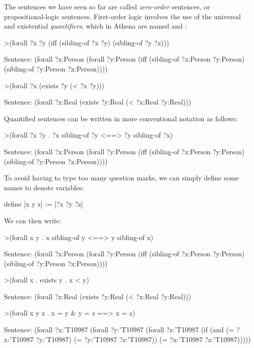 The sentences we have seen so far are called {\em zero-order\/} sentences, or propositional-logic sentences. First-order logic involves the use of the universal and existential {\em quantifiers}, 
which in Athena are named  and :
\begin{tcAthena}[upquote=true]
>(forall ?x ?y (iff (sibling-of ?x ?y) 
                    (sibling-of ?y ?x)))

Sentence: (forall ?x:Person
            (forall ?y:Person
              (iff (sibling-of ?x:Person ?y:Person)
                   (sibling-of ?y:Person ?x:Person))))

>(forall ?x (exists ?y (< ?x ?y)))

Sentence: (forall ?x:Real
            (exists ?y:Real
              (< ?x:Real ?y:Real)))
\end{tcAthena}
Quantified sentences can be written in more conventional notation as follows:
\begin{tcAthena}[upquote=true]
>(forall ?x ?y . ?x sibling-of ?y <==> ?y sibling-of ?x)

Sentence: (forall ?x:Person
            (forall ?y:Person
              (iff (sibling-of ?x:Person ?y:Person)
                   (sibling-of ?y:Person ?x:Person))))
\end{tcAthena}
To avoid having to type too many question marks, we can simply define some names to denote variables: 
\begin{tcAthena}[upquote=true]
define [x y z] := [?x ?y ?z]
\end{tcAthena}
We can then write: 
\begin{tcAthena}[upquote=true]
>(forall x y . x sibling-of y <==> y sibling-of x)

Sentence: (forall ?x:Person
            (forall ?y:Person
              (iff (sibling-of ?x:Person ?y:Person)
                   (sibling-of ?y:Person ?x:Person))))

>(forall x . exists y . x < y)

Sentence: (forall ?x:Real
            (exists ?y:Real
              (< ?x:Real ?y:Real)))

>(forall x y z . x = y & y = z ==> x = z)

Sentence: (forall ?x:'T10987
            (forall ?y:'T10987
              (forall ?z:'T10987
                (if (and (= ?x:'T10987 ?y:'T10987)
                         (= ?y:'T10987 ?z:'T10987))
                    (= ?x:'T10987 ?z:'T10987)))))
\end{tcAthena}



